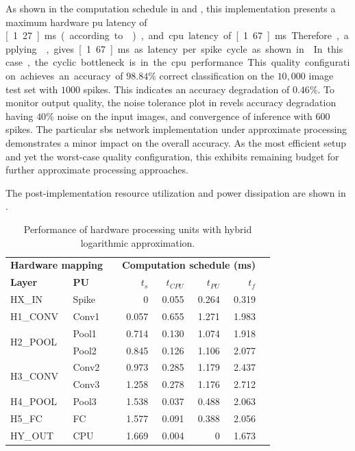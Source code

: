 As shown in the computation schedule in  and , this implementation presents a maximum hardware \gls{pu} latency of \unit[1.27]{ms} (according to ), and \gls{cpu} latency of \unit[1.67]{ms}. Therefore, applying , gives \unit[1.67]{ms} as latency per spike cycle as shown in . In this case, the cyclic bottleneck is in the \gls{cpu} performance.

This quality configuration achieves an accuracy of $98.84\%$ correct classification on the $10,000$ image test set with $1000$ spikes. This indicates an accuracy degradation of $0.46\%$. To monitor output quality, the noise tolerance plot in  revels accuracy degradation having $40\%$ noise on the input images, and convergence of inference with $600$ spikes. The particular \gls{sbs} network implementation under approximate processing demonstrates a minor impact on the overall accuracy. As the most efficient setup and yet the worst-case quality configuration, this exhibits remaining budget for further approximate processing approaches.

The post-implementation resource utilization and power dissipation are shown in .

\begin{table}[t!]\centering
	\caption{Performance of hardware processing units with hybrid logarithmic approximation.}\label{tab:latency_log}
	\scriptsize
	\begin{tabular}{llrrrrrr}\toprule
		\multicolumn{2}{c}{\textbf{Hardware mapping}} & &\multicolumn{4}{c}{\textbf{Computation schedule (ms)}} \\\cmidrule{1-2}\cmidrule{4-7}
		\textbf{Layer} &\textbf{PU} & &$t_s$ &$t_{CPU}$ &$t_{PU}$ &$t_f$ \\\midrule
		HX\_IN &Spike & &0 &0.055 &0.264 &0.319 \\
		H1\_CONV &Conv1 & &0.057 &0.655 &1.271 &1.983 \\
		\multirow{2}{*}{H2\_POOL} &Pool1 & &0.714 &0.130 &1.074 &1.918 \\
		&Pool2 & &0.845 &0.126 &1.106 &2.077 \\
		\multirow{2}{*}{H3\_CONV} &Conv2 & &0.973 &0.285 &1.179 &2.437 \\
		&Conv3 & &1.258 &0.278 &1.176 &2.712 \\
		H4\_POOL &Pool3 & &1.538 &0.037 &0.488 &2.063 \\
		H5\_FC &FC & &1.577 &0.091 &0.388 &2.056 \\
		HY\_OUT &CPU & &1.669 &0.004 &0 &1.673 \\
		\bottomrule
	\end{tabular}
\end{table}

